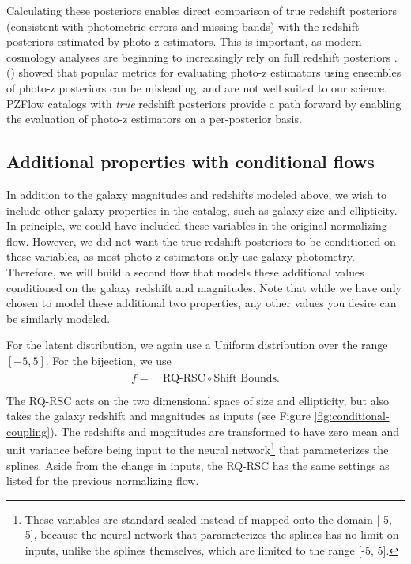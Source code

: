 \documentclass[twocolumn,twocolappendix]{aastex631}
\newcommand{\citePZt}{\citetalias{schmidt2020} (\citeyear{schmidt2020})\xspace}
\begin{document}
Calculating these posteriors enables direct comparison of true redshift posteriors (consistent with photometric errors and missing bands) with the redshift posteriors estimated by photo-z estimators.
This is important, as modern cosmology analyses are beginning to increasingly rely on full redshift posteriors \citep{mandelbaum2008,newman2022}.
\citePZt showed that popular metrics for evaluating photo-z estimators using ensembles of photo-z posteriors can be misleading, and are not well suited to our science.
PZFlow catalogs with \emph{true} redshift posteriors provide a path forward by enabling the evaluation of photo-z estimators on a per-posterior basis.


\subsection{Additional properties with conditional flows}
\label{sec:fwd-model-conditional}

In addition to the galaxy magnitudes and redshifts modeled above, we wish to include other galaxy properties in the catalog, such as galaxy size and ellipticity.
In principle, we could have included these variables in the original normalizing flow.
However, we did not want the true redshift posteriors to be conditioned on these variables, as most photo-z estimators only use galaxy photometry.
Therefore, we will build a second flow that models these additional values conditioned on the galaxy redshift and magnitudes.
Note that while we have only chosen to model these additional two properties, any other values you desire can be similarly modeled.

For the latent distribution, we again use a Uniform distribution over the range $[-5, 5]$.
For the bijection, we use
\begin{align}
    \begin{split}
        f =& ~ \text{RQ-RSC} \circ \text{Shift Bounds}. \\
    \end{split}
\end{align}
The RQ-RSC acts on the two dimensional space of size and ellipticity, but also takes the galaxy redshift and magnitudes as inputs (see Figure \ref{fig:conditional-coupling}).
The redshifts and magnitudes are transformed to have zero mean and unit variance before being input to the neural network\footnote{These variables are standard scaled instead of mapped onto the domain [-5, 5], because the neural network that parameterizes the splines has no limit on inputs, unlike the splines themselves, which are limited to the range [-5, 5].} that parameterizes the splines.
Aside from the change in inputs, the RQ-RSC has the same settings as listed for the previous normalizing flow.
\end{document}

